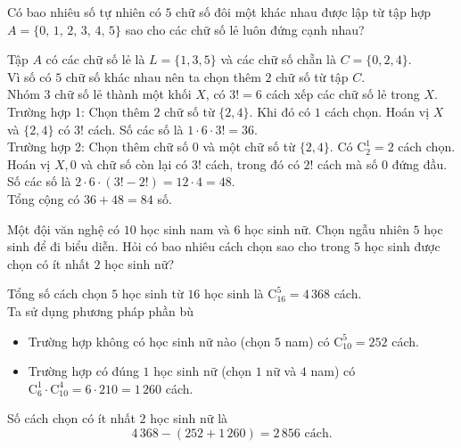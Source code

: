 \begin{ex}%
	Có bao nhiêu số tự nhiên có $5$ chữ số đôi một khác nhau được lập từ tập hợp  $A = \{0,\,1,\,2,\,3,\,4,\,5\}$ sao cho các chữ số lẻ luôn đứng cạnh nhau?
	\par
	\loigiai
	{
		Tập $A$ có các chữ số lẻ là $L = \{1, 3, 5\}$ và các chữ số chẵn là $C = \{0, 2, 4\}$. \\
		Vì số có $5$ chữ số khác nhau nên ta chọn thêm $2$ chữ số từ tập $C$. \\
		Nhóm $3$ chữ số lẻ thành một khối $X$, có $3! = 6$ cách xếp các chữ số lẻ trong $X$. \\
		Trường hợp 1: Chọn thêm $2$ chữ số từ $\{2, 4\}$. Khi đó có $1$ cách chọn. Hoán vị $X$ và $\{2, 4\}$ có $3!$ cách. Số các số là $1 \cdot  6 \cdot  3! = 36$. \\
		Trường hợp 2: Chọn thêm chữ số $0$ và một chữ số từ $\{2, 4\}$. Có $\mathrm{C}_2^1 = 2$ cách chọn. Hoán vị $X, 0$ và chữ số còn lại có $3!$ cách, trong đó có $2!$ cách mà số $0$ đứng đầu. \\
		Số các số là $2 \cdot  6 \cdot  (3! - 2!) = 12 \cdot  4 = 48$. \\
		Tổng cộng có $36 + 48 = 84$ số.
	}
\end{ex}
 
\setcounter{ex}{0}
\begin{ex}%
	Một đội văn nghệ có $10$ học sinh nam và $6$ học sinh nữ. Chọn ngẫu nhiên $5$ học sinh để đi biểu diễn. Hỏi có bao nhiêu cách chọn sao cho trong $5$ học sinh được chọn có ít nhất $2$ học sinh nữ?
	\loigiai
	{
		Tổng số cách chọn $5$ học sinh từ $16$ học sinh là $\mathrm{C}_{16}^5 = 4\,368$ cách. \\
		Ta sử dụng phương pháp phần bù
		\begin{itemize}
			\item Trường hợp không có học sinh nữ nào (chọn $5$ nam) có $\mathrm{C}_{10}^5 = 252$ cách.
			\item Trường hợp có đúng $1$ học sinh nữ (chọn $1$ nữ và $4$ nam) có $\mathrm{C}_6^1 \cdot \mathrm{C}_{10}^4 = 6 \cdot 210 = 1\,260$ cách.
		\end{itemize}
		Số cách chọn có ít nhất $2$ học sinh nữ là
		$$ 4\,368 - (252 + 1\,260) = 2\,856 \text{ cách.} $$
	}
\end{ex}

